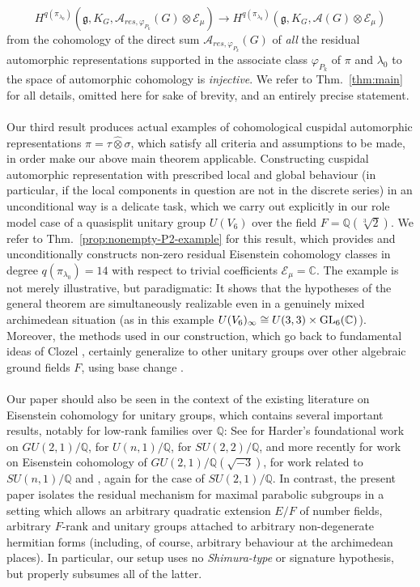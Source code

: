 \documentclass[a4paper,10pt]{amsart}
\theoremstyle{definition}
\numberwithin{equation}{section}
\def\Q{\mathbb Q}
\def\C{\mathbb C}
\def\EE{\mathcal E}
\def\g{\mathfrak g}
\def\GL{{\rm GL}}
\begin{document}
$$H^{q(\pi_{\lambda_0})}(\g,K_G,\mathcal A_{res,\varphi_{P_k}}(G)\otimes\EE_\mu)\longrightarrow H^{q(\pi_{\lambda_0})}(\g,K_G,\mathcal A(G)\otimes\EE_\mu)$$
from the cohomology of the direct sum $\mathcal A_{res,\varphi_{P_k}}(G)$ of {\it all} the residual automorphic representations supported in the associate class $\varphi_{P_k}$ of $\pi$ and $\lambda_0$ to the space of automorphic cohomology is {\it injective}. We refer to Thm.\ \ref{thm:main} for all details, omitted here for sake of brevity, and an entirely precise statement.\\\\
Our third result produces actual examples of cohomological cuspidal automorphic representations $\pi=\tau\widehat\otimes\sigma$, which satisfy all criteria and assumptions to be made, in order make our above main theorem applicable. Constructing cuspidal automorphic representation with prescribed local and global behaviour (in particular, if the local components in question are not in the discrete series) in an unconditional way is a delicate task, which we carry out explicitly in our role model case of a quasisplit unitary group $U(V_6)$ over the field $F=\Q(\sqrt[3]{2})$. We refer to Thm.\ \ref{prop:nonempty-P2-example} for this result, which provides and unconditionally constructs non-zero residual Eisenstein cohomology classes in degree $q(\pi_{\lambda_0})=14$ with respect to trivial coefficients $\EE_\mu=\C$. The example is not merely illustrative, but paradigmatic: It shows that the hypotheses of the general theorem are simultaneously realizable even in a genuinely mixed archimedean situation (as in this example $U(V_6)_\infty\cong U(3,3)\times \GL_6(\C)$). Moreover, the methods used in our construction, which go back to fundamental ideas of Clozel \cite{clozelSLN}, certainly generalize to other unitary groups over other algebraic ground fields $F$, using base change \cite{mok, KMSW, zou}.\\\\
Our paper should also be seen in the context of the existing literature on Eisenstein cohomology for unitary groups, which contains several important results, notably for low-rank families over \(\mathbb Q\): See \cite{harderGU} for Harder's foundational work on $GU(2,1)/\Q$, \cite{grabschwun} for \(U(n,1)/\mathbb Q\), \cite{hayataschwermer} for \(SU(2,2)/\mathbb Q\), and more recently \cite{Ber-vdG22} for work on Eisenstein cohomology of $GU(2,1)/\Q(\sqrt{-3})$,  \cite{nairrai} for work related to \(SU(n,1)/\mathbb Q\) and \cite{bajcav}, again for the case of $SU(2,1)/\Q$. In contrast, the present paper isolates the residual mechanism for maximal parabolic subgroups in a setting which allows an arbitrary quadratic extension \(E/F\) of number fields, arbitrary \(F\)-rank and unitary groups attached to arbitrary non-degenerate hermitian forms (including, of course, arbitrary behaviour at the archimedean places). In particular, our setup uses no {\it Shimura-type} or signature hypothesis, but properly subsumes all of the latter.\\\\
\end{document}
